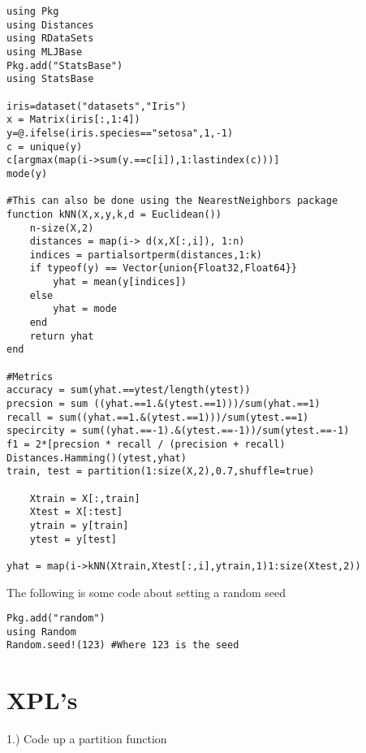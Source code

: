 \begin{lstlisting}
using Pkg
using Distances
using RDataSets
using MLJBase
Pkg.add("StatsBase")
using StatsBase

iris=dataset("datasets","Iris")
x = Matrix(iris[:,1:4])
y=@.ifelse(iris.species=="setosa",1,-1)
c = unique(y)
c[argmax(map(i->sum(y.==c[i]),1:lastindex(c)))]
mode(y)

#This can also be done using the NearestNeighbors package
function kNN(X,x,y,k,d = Euclidean())
    n-size(X,2)
    distances = map(i-> d(x,X[:,i]), 1:n)
    indices = partialsortperm(distances,1:k)
    if typeof(y) == Vector{union{Float32,Float64}}
        yhat = mean(y[indices])
    else
        yhat = mode
    end
    return yhat
end

#Metrics
accuracy = sum(yhat.==ytest/length(ytest))
precsion = sum ((yhat.==1.&(ytest.==1)))/sum(yhat.==1)
recall = sum((yhat.==1.&(ytest.==1)))/sum(ytest.==1)
specircity = sum((yhat.==-1).&(ytest.==-1))/sum(ytest.==-1)
f1 = 2*[precsion * recall / (precision + recall)
Distances.Hamming()(ytest,yhat)
train, test = partition(1:size(X,2),0.7,shuffle=true)

    Xtrain = X[:,train]
    Xtest = X[:test]
    ytrain = y[train]
    ytest = y[test]

yhat = map(i->kNN(Xtrain,Xtest[:,i],ytrain,1)1:size(Xtest,2))

\end{lstlisting}

The following is some code about setting a random seed
\begin{lstlisting}
Pkg.add("random")
using Random
Random.seed!(123) #Where 123 is the seed
\end{lstlisting}


\section{XPL's}
1.) Code up a partition function



